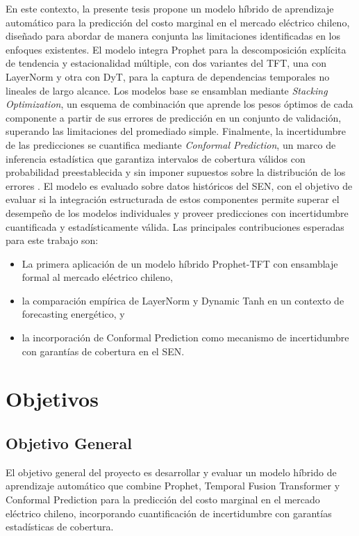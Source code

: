 En este contexto, la presente tesis propone un modelo híbrido de aprendizaje automático para la predicción del costo marginal en el mercado eléctrico chileno, diseñado para abordar de manera conjunta las limitaciones identificadas en los enfoques existentes. El modelo integra Prophet para la descomposición explícita de tendencia y estacionalidad múltiple, con dos variantes del TFT, una con LayerNorm y otra con DyT, para la captura de dependencias temporales no lineales de largo alcance. Los modelos base se ensamblan mediante \textit{Stacking Optimization}, un esquema de combinación que aprende los pesos óptimos de cada componente a partir de sus errores de predicción en un conjunto de validación, superando las limitaciones del promediado simple. Finalmente, la incertidumbre de las predicciones se cuantifica mediante \textit{Conformal Prediction}, un marco de inferencia estadística que garantiza intervalos de cobertura válidos con probabilidad preestablecida y sin imponer supuestos sobre la distribución de los errores \cite{ConformalPrediction}. El modelo es evaluado sobre datos históricos del SEN, con el objetivo de evaluar si la integración estructurada de estos componentes permite superar el desempeño de los modelos individuales y proveer predicciones con incertidumbre cuantificada y estadísticamente válida. Las principales contribuciones esperadas para este trabajo son: 
\begin{itemize}
    \item[(i)] La primera aplicación de un modelo híbrido Prophet-TFT con ensamblaje formal al mercado eléctrico chileno, 

    \item[(ii)] la comparación empírica de LayerNorm y Dynamic Tanh en un contexto de forecasting energético, y

    \item[(iii)] la incorporación de Conformal Prediction como mecanismo de incertidumbre con garantías de cobertura en el SEN.
\end{itemize}
 
\section{Objetivos}

\subsection{Objetivo General}

El objetivo general del proyecto es desarrollar y evaluar un modelo híbrido de aprendizaje automático que combine Prophet, Temporal Fusion Transformer y Conformal Prediction para la predicción del costo marginal en el mercado eléctrico chileno, incorporando cuantificación de incertidumbre con garantías estadísticas de cobertura.


